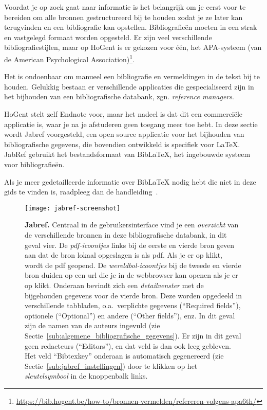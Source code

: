Voordat je op zoek gaat naar informatie is het belangrijk om je eerst voor te bereiden om alle bronnen gestructureerd bij te houden zodat je ze later kan terugvinden en een bibliografie kan opstellen. Bibliografieën moeten in een strak en vastgelegd formaat worden opgesteld. Er zijn veel verschillende bibliografiestijlen, maar op HoGent is er gekozen voor één, het APA-systeem (van de American Psychological Association)\footnote{\url{https://bib.hogent.be/how-to/bronnen-vermelden/refereren-volgens-apa6th/}}.

Het is ondoenbaar om manueel een bibliografie en vermeldingen in de tekst bij te houden.  Gelukkig bestaan er verschillende applicaties die gespecialiseerd zijn in het bijhouden van een bibliografische databank, zgn. \emph{reference managers}.

HoGent stelt zelf Endnote voor, maar het nadeel is dat dit een commerciële applicatie is, waar je na je afstuderen geen toegang meer toe hebt. In deze sectie wordt Jabref voorgesteld, een open source applicatie voor het bijhouden van bibliografische gegevens, die bovendien ontwikkeld is specifiek voor {\LaTeX}. JabRef gebruikt het bestandsformaat van Bib{\LaTeX}, het ingebouwde systeem voor bibliografieën.

Als je meer gedetailleerde informatie over Bib{\LaTeX} nodig hebt die niet in deze gids te vinden is, raadpleeg dan de handleiding~\autocite{LehmanEtAl2016}.

\begin{figure}
  \centering
  \texttt{[image: jabref-screenshot]}
  \caption[Jabref]{\textbf{Jabref.} Centraal in de gebruikersinterface vind je een \emph{overzicht} van de verschillende bronnen in deze bibliografische databank, in dit geval vier. De \emph{pdf-icoontjes} links bij de eerste en vierde bron geven aan dat de bron lokaal opgeslagen is als pdf. Als je er op klikt, wordt de pdf geopend. De \emph{wereldbol-icoontjes} bij de tweede en vierde bron duiden op een url die je in de webbrowser kan openen als je er op klikt. Onderaan bevindt zich een \emph{detailvenster} met de bijgehouden gegevens voor de vierde bron. Deze worden opgedeeld in verschillende tabbladen, o.a.~verplichte gegevens (``Required fields''), optionele (``Optional'') en andere (``Other fields''), enz. In dit geval zijn de namen van de auteurs ingevuld (zie Sectie~\ref{sub:algemene_bibliografische_gegevens}). Er zijn in dit geval geen redacteurs (``Editors''), en dat veld is dan ook leeg gebleven. Het veld ``Bibtexkey'' onderaan is automatisch gegenereerd (zie Sectie~\ref{sub:jabref_instellingen}) door te klikken op het \emph{sleutelsymbool} in de knoppenbalk links.}
  \label{fig:jabref}
\end{figure}

